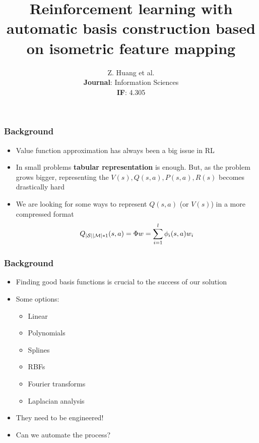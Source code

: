 \documentclass{beamer}
\title{Reinforcement learning with automatic basis construction
based on isometric feature mapping}
\author{Z. Huang et al. \\ \textbf{Journal}: Information Sciences \\ \textbf{IF}: 4.305}
\date{}
\DeclarePairedDelimiter\abs{\lvert}{\rvert}%
\begin{document}
\begin{frame}
	\maketitle

\end{frame}
\begin{frame}
	\frametitle{Background}
	\begin{itemize}
		\item Value function approximation has always been a big issue in RL
		\item In small problems \textbf{tabular representation} is enough. But, as the problem grows bigger, representing the $V(s), Q(s,a), P(s,a), R(s)$ becomes drastically hard
		\item We are looking for some ways to represent $Q(s,a)$ (or $V(s)$) in a more compressed format
		\[
			Q_{\abs{\mathcal{S}} \abs{\mathcal{M}}*1}(s,a) = \Phi w = \sum_{i = 1}^l \phi_i(s,a) w_i
		\] 
	
	\end{itemize}

\end{frame}

\begin{frame}
	\frametitle{Background}
	\begin{itemize}
		\item Finding good basis functions is crucial to the success of our solution
		\item Some options:
		\begin{itemize}
			\item Linear
			\item Polynomials
			\item Splines
			\item RBFs
			\item Fourier transforms
			\item Laplacian analysis
		\end{itemize}
		\item They need to be engineered!
		\item Can we automate the process?
	\end{itemize}
\end{frame}
\end{document}
